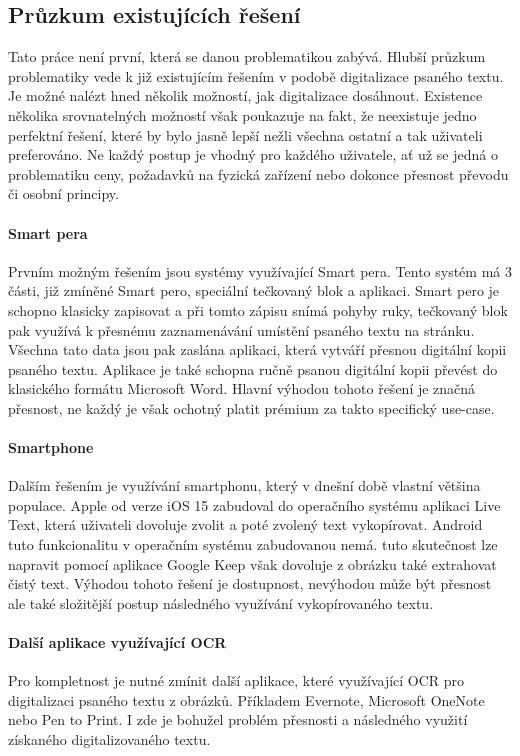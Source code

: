 \documentclass[journal]{IEEEtran}
\begin{document}
\subsection{Průzkum existujících řešení}
Tato práce není první, která se danou problematikou zabývá.
Hlubší průzkum problematiky vede k již existujícím řešením v podobě digitalizace psaného textu.
Je možné nalézt hned několik možností, jak digitalizace dosáhnout.
Existence několika srovnatelných možností však poukazuje na fakt, že neexistuje jedno perfektní řešení, které by bylo jasně lepší nežli všechna ostatní a tak uživateli preferováno.
Ne každý postup je vhodný pro každého uživatele, ať už se jedná o problematiku ceny, požadavků na fyzická zařízení nebo dokonce přesnost převodu či osobní principy.\cite{aarp_digitalization, popupalr_science_digitalization_with_pens}

\paragraph{Smart pera}
Prvním možným řešením jsou systémy využívající Smart pera.
Tento systém má 3 části, již zmíněné Smart pero, speciální tečkovaný blok a aplikaci.
Smart pero je schopno klasicky zapisovat a při tomto zápisu snímá pohyby ruky, tečkovaný blok pak využívá k přesnému zaznamenávání umístění psaného textu na stránku. Všechna tato data jsou pak zaslána aplikaci, která vytváří přesnou digitální kopii psaného textu. Aplikace je také schopna ručně psanou digitální kopii převést do klasického formátu Microsoft Word. Hlavní výhodou tohoto řešení je značná přesnost, ne každý je však ochotný platit prémium za takto specifický use-case.\cite{popupalr_science_digitalization_with_pens}

\paragraph{Smartphone}
Dalším řešením je využívání smartphonu, který v dnešní době vlastní většina populace.
Apple od verze iOS 15 zabudoval do operačního systému aplikaci Live Text, která uživateli dovoluje zvolit a poté zvolený text vykopírovat.
Android  tuto funkcionalitu v operačním systému zabudovanou nemá. tuto skutečnost lze napravit pomocí aplikace Google Keep však dovoluje z obrázku také extrahovat čistý text.\cite{aarp_digitalization, google_keep}
Výhodou tohoto řešení je dostupnost, nevýhodou může být přesnost ale také složitější postup následného využívání vykopírovaného textu.

\paragraph{Další aplikace využívající OCR}
Pro kompletnost je nutné zmínit další aplikace, které využívající \ac{OCR} pro digitalizaci psaného textu z obrázků. Příkladem Evernote\cite{evernote}, Microsoft OneNote\cite{onenote} nebo Pen to Print\cite{pen_to_print}.
I zde je bohužel problém přesnosti a následného využití získaného digitalizovaného textu.
\end{document}

